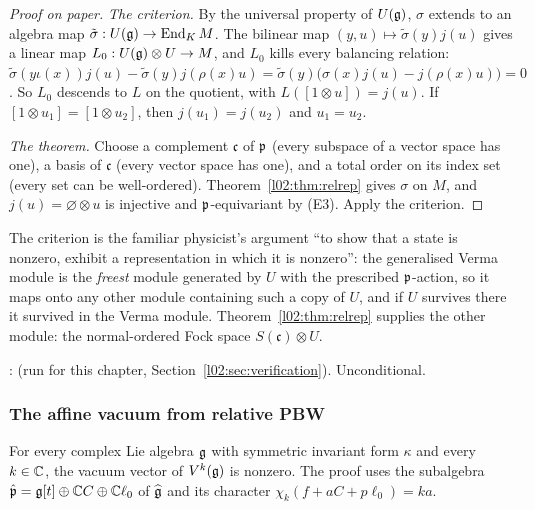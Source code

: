\begin{proof}[Proof on paper]
\emph{The criterion.} By the universal property of $U(\mathfrak{g})$, $\sigma$ extends to an algebra map
$\tilde\sigma : U(\mathfrak{g})\to\operatorname{End}_K M$. The bilinear map $(y,u)\mapsto\tilde\sigma(y)j(u)$ gives a linear map
$L_0 : U(\mathfrak{g})\otimes U\to M$, and $L_0$ kills every balancing relation:
$\tilde\sigma(y\iota(x))j(u) - \tilde\sigma(y)j(\rho(x)u) = \tilde\sigma(y)\bigl(\sigma(x)j(u) - j(\rho(x)u)\bigr) = 0$. So $L_0$
descends to $L$ on the quotient, with $L([1\otimes u]) = j(u)$. If $[1\otimes u_1] = [1\otimes u_2]$, then
$j(u_1) = j(u_2)$ and $u_1 = u_2$.

\emph{The theorem.} Choose a complement $\mathfrak c$ of $\mathfrak{p}$ (every subspace of a vector space has one), a
basis of $\mathfrak c$ (every vector space has one), and a total order on its index set (every set can be
well-ordered). Theorem~\ref{l02:thm:relrep} gives $\sigma$ on $M$, and $j(u) = \varnothing\otimes u$ is
injective and $\mathfrak{p}$-equivariant by (E3). Apply the criterion.
\end{proof}

\begin{physics}
The criterion is the familiar physicist's argument ``to show that a state is nonzero, exhibit a
representation in which it is nonzero'': the generalised Verma module is the \emph{freest} module
generated by $U$ with the prescribed $\mathfrak{p}$-action, so it maps onto any other module containing such a
copy of $U$, and if $U$ survives there it survived in the Verma module. Theorem~\ref{l02:thm:relrep}
supplies the other module: the normal-ordered Fock space $S(\mathfrak c)\otimes U$.
\end{physics}

\begin{status}
\allowbreak{}\allowbreak{}\allowbreak{}: 
(run for this chapter, Section~\ref{l02:sec:verification}). Unconditional.
\end{status}

\subsubsection{The affine vacuum from relative PBW}

\begin{theorem}\label{l02:thm:vacind}
For every complex Lie algebra $\mathfrak{g}$ with symmetric invariant form $\kappa$ and every $k\in{\mathbb{C}}$, the vacuum
vector of $V^k(\mathfrak{g})$ is nonzero. The proof uses the subalgebra
$\hat{\mathfrak{p}} = \mathfrak{g}[t]\oplus{\mathbb{C}} C\oplus{\mathbb{C}}\ell_0$ of $\widehat{\mathfrak{g}}$ and its character $\chi_k(f + aC + p\ell_0) = ka$.
\end{theorem}

